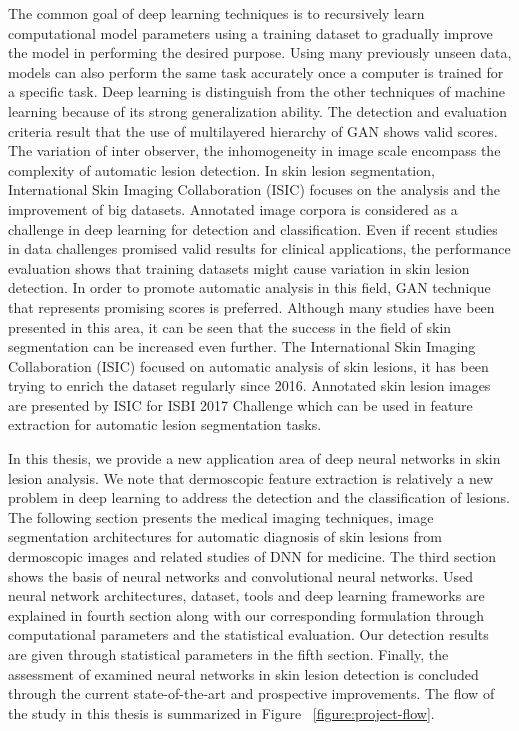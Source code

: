 The common goal of deep learning techniques is to recursively learn computational model parameters using a training dataset to gradually improve the model in performing the desired purpose.
Using many previously unseen data, models can also perform the same task accurately once a computer is trained for a specific task.
Deep learning is distinguish from the other techniques of machine learning because of its strong generalization ability.
The detection and evaluation criteria result that the use of multilayered hierarchy of GAN shows valid scores.
The variation of inter observer, the inhomogeneity in image scale encompass the complexity of automatic lesion detection.
In skin lesion segmentation, International Skin Imaging Collaboration (ISIC) focuses on the analysis and the improvement of big datasets.
Annotated image corpora is considered as a challenge in deep learning for detection and classification.
Even if recent studies in data challenges promised valid results for clinical applications, the performance evaluation shows that training datasets might cause variation in skin lesion detection.
In order to promote automatic analysis in this field, GAN technique that represents promising scores is preferred.
Although many studies have been presented in this area, it can be seen that the success in the field of skin segmentation can be increased even further.
The International Skin Imaging Collaboration (ISIC) focused on automatic analysis of skin lesions, it has been trying to enrich the dataset regularly since 2016.
Annotated skin lesion images are presented by ISIC for ISBI 2017 Challenge which can be used in feature extraction for automatic lesion segmentation tasks.



In this thesis, we provide a new application area of deep neural networks in skin lesion analysis.
We note that dermoscopic feature extraction is relatively a new problem in deep learning to address the detection and the classification of lesions.
The following section presents the medical imaging techniques, image segmentation architectures for automatic diagnosis of skin lesions from dermoscopic images and related studies of DNN for medicine.
The third section shows the basis of neural networks and convolutional neural networks.
Used neural network architectures, dataset, tools and deep learning frameworks are explained in fourth section
along with our corresponding formulation through computational parameters and the statistical evaluation.
Our detection results are given through statistical parameters in the fifth section.
Finally, the assessment of examined neural networks in skin lesion detection is concluded through the current state-of-the-art and prospective improvements.
The flow of the study in this thesis is summarized in Figure ~\ref{figure:project-flow}.

